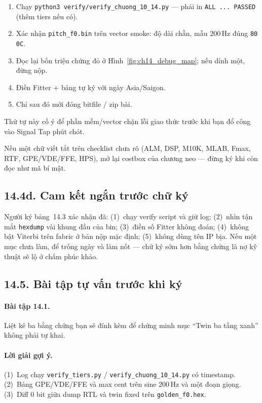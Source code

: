 \begin{enumerate}[leftmargin=1.4em]
  \item Chạy \texttt{python3 verify/verify\_chuong\_10\_14.py} --- phải in \texttt{ALL ... PASSED} (thêm tiers nếu có).
  \item Xác nhận \texttt{pitch\_f0.bin} trên vector smoke: độ dài chẵn, mẫu $200\,\text{Hz}$ đúng \texttt{80 0C}.
  \item Đọc lại bốn triệu chứng đỏ ở Hình~\ref{fig:ch14_debug_map}; nếu dính một, đừng nộp.
  \item Điền Fitter + bảng tự ký với ngày Asia/Saigon.
  \item Chỉ sau đó mới đóng bitfile / zip bài.
\end{enumerate}
Thứ tự này cố ý để phần mềm/vector chặn lỗi giao thức trước khi bạn đổ công vào Signal Tap phút chót.

Nếu một chữ viết tắt trên checklist chưa rõ (ALM, DSP, M10K, MLAB, Fmax, RTF, GPE/VDE/FFE, HPS), mở lại costbox của chương neo --- đừng ký khi còn đọc như mã bí mật.

\subsection*{14.4d. Cam kết ngắn trước chữ ký}

Người ký bảng~14.3 xác nhận đã: (1)~chạy verify script và giữ log; (2)~nhìn tận mắt \texttt{hexdump} vài khung đầu của bin; (3)~điền số Fitter không đoán; (4)~không bật Viterbi trên fabric ở bản nộp mặc định; (5)~không dùng tên IP bịa. Nếu một mục chưa làm, để trống ngày và làm nốt --- chữ ký sớm hơn bằng chứng là nợ kỹ thuật sẽ lộ ở chấm phúc khảo.


\subsection*{14.5. Bài tập tự vấn trước khi ký}

\paragraph{Bài tập 14.1.} Liệt kê ba bằng chứng bạn sẽ đính kèm để chứng minh mục ``Twin ba tầng xanh'' không phải tự khai.

\paragraph{Lời giải gợi ý.} (1)~Log chạy \texttt{verify\_tiers.py} / \texttt{verify\_chuong\_10\_14.py} có timestamp. (2)~Bảng GPE/VDE/FFE và max cent trên sine $200\,\text{Hz}$ và một đoạn giọng. (3)~Diff $0$ bit giữa dump RTL và twin fixed trên \texttt{golden\_f0.hex}.

